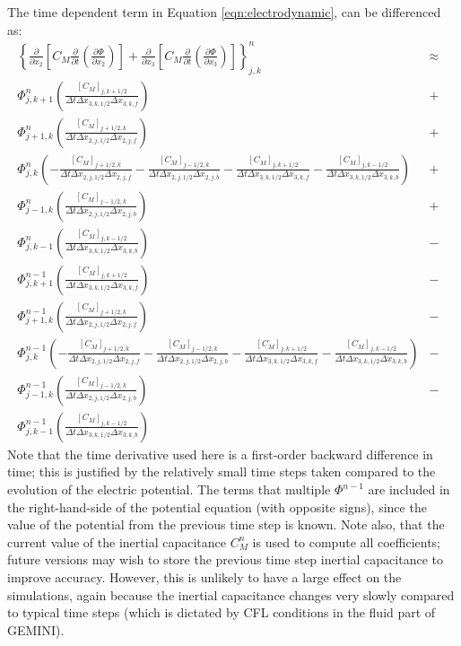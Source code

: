 \documentclass[11pt,letterpaper]{article}
\begin{document}
The time dependent term in Equation \ref{eqn:electrodynamic}, can be differenced as:  
\begin{eqnarray}
\left\{ \frac{\partial}{\partial x_2} \left[ C_M \frac{\partial}{\partial t} \left( \frac{\partial \Phi}{\partial x_2} \right) \right] + \frac{\partial}{\partial x_3} \left[ C_M \frac{\partial}{\partial t} \left( \frac{\partial \Phi}{\partial x_3} \right) \right] \right\}_{j,k}^n &\approx& \nonumber \\
\Phi_{j,k+1}^n \left( \frac{[C_M]_{j,k+1/2}}{\Delta t \Delta x_{3,k,1/2} \Delta x_{3,k,f}} \right) &+& \nonumber \\
\Phi_{j+1,k}^n \left( \frac{[C_M]_{j+1/2,k}}{\Delta t \Delta x_{2,j,1/2} \Delta x_{2,j,f}} \right) &+& \nonumber \\
\Phi_{j,k}^n \left( -\frac{[C_M]_{j+1/2,k}}{\Delta t \Delta x_{2,j,1/2} \Delta x_{2,j,f}}  - \frac{[C_M]_{j-1/2,k}}{\Delta t \Delta x_{2,j,1/2} \Delta x_{2,j,b}} - \frac{[C_M]_{j,k+1/2}}{\Delta t \Delta x_{3,k,1/2} \Delta x_{3,k,f}} - \frac{[C_M]_{j,k-1/2}}{\Delta t \Delta x_{3,k,1/2} \Delta x_{3,k,b}} \right) &+& \nonumber \\
\Phi_{j-1,k}^n \left( \frac{[C_M]_{j-1/2,k}}{\Delta t \Delta x_{2,j,1/2} \Delta x_{2,j,b}} \right) &+& \nonumber \\
\Phi_{j,k-1}^n \left( \frac{[C_M]_{j,k-1/2}}{\Delta t \Delta x_{3,k,1/2} \Delta x_{3,k,b}} \right) &-& \nonumber \\
\Phi_{j,k+1}^{n-1} \left( \frac{[C_M]_{j,k+1/2}}{\Delta t \Delta x_{3,k,1/2} \Delta x_{3,k,f}} \right) &-& \nonumber \\
\Phi_{j+1,k}^{n-1} \left( \frac{[C_M]_{j+1/2,k}}{\Delta t \Delta x_{2,j,1/2} \Delta x_{2,j,f}} \right) &-& \nonumber \\
\Phi_{j,k}^{n-1} \left( -\frac{[C_M]_{j+1/2,k}}{\Delta t \Delta x_{2,j,1/2} \Delta x_{2,j,f}}  - \frac{[C_M]_{j-1/2,k}}{\Delta t \Delta x_{2,j,1/2} \Delta x_{2,j,b}} - \frac{[C_M]_{j,k+1/2}}{\Delta t \Delta x_{3,k,1/2} \Delta x_{3,k,f}} - \frac{[C_M]_{j,k-1/2}}{\Delta t \Delta x_{3,k,1/2} \Delta x_{3,k,b}} \right) &-& \nonumber \\
\Phi_{j-1,k}^{n-1} \left( \frac{[C_M]_{j-1/2,k}}{\Delta t \Delta x_{2,j,1/2} \Delta x_{2,j,b}} \right) &-& \nonumber \\
\Phi_{j,k-1}^{n-1} \left( \frac{[C_M]_{j,k-1/2}}{\Delta t \Delta x_{3,k,1/2} \Delta x_{3,k,b}} \right)
\end{eqnarray}
Note that the time derivative used here is a first-order backward difference in time; this is justified by the relatively small time steps taken compared to the evolution of the electric potential.  The terms that multiple $\Phi^{n-1}$ are included in the right-hand-side of the potential equation (with opposite signs), since the value of the potential from the previous time step is known.  Note also, that the current value of the inertial capacitance $C_M^n$ is used to compute all coefficients; future versions may wish to store the previous time step inertial capacitance to improve accuracy.  However, this is unlikely to have a large effect on the simulations, again because the inertial capacitance changes very slowly compared to typical time steps (which is dictated by CFL conditions in the fluid part of GEMINI).  
\end{document}
